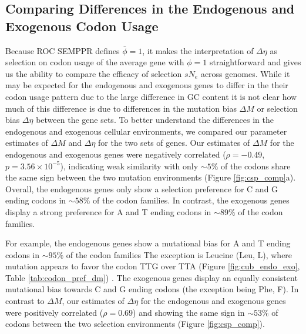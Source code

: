 \documentclass[doublespacing,linenumbers]{bmcart-modified}
\newcommand{\ROC}{ROC SEMPPR\xspace}
\newcommand{\GC}{GC content\xspace}
\newcommand{\DM}{\ensuremath{{\Delta M}}\xspace}
\newcommand{\DE}{\ensuremath{{\Delta \eta}}\xspace}
\newcommand{\Ne}{\ensuremath{N_e}\xspace}
\newcommand{\barphi}{\ensuremath{\bar{\phi}}\xspace}
\begin{document}
\subsection*{Comparing Differences in the Endogenous and Exogenous Codon Usage}
Because \ROC defines $\barphi= 1$,  it makes the interpretation of \DE as selection on codon usage of the average gene with $\phi = 1$ straightforward and gives us the ability to compare the efficacy of selection $s\Ne$  across genomes.
While it may be expected for the endogenous and exogenous genes to differ in the their codon usage pattern due to the large difference in \GC it is not clear how much of this difference is due to differences in the mutation bias \DM or selection bias \DE between the gene sets.
To better understand the differences in the endogenous and exogenous cellular environments, we compared our parameter estimates of  \DM and \DE for the two sets of genes.
Our estimates of \DM for the endogenous and exogenous genes were negatively correlated ($\rho = -0.49$, $p = 3.56\times10^{-5}$),  indicating weak similarity with only $\sim 5\%$ of the codons share the same sign between the two mutation environments (Figure \ref{fig:csp_comp}a).
Overall, the endogenous genes only show a selection preference for C and G ending codons in $\sim58\%$ of the codon families.
In contrast, the exogenous genes display a strong preference for A and T ending codons in $\sim89\%$ of the codon families.

For example, the endogenous genes show a mutational bias for A and T ending codons in $\sim95\%$ of the codon families
The exception is Leucine (Leu, L), where mutation appears to favor the codon TTG over TTA  (Figure \ref{fig:cub_endo_exo}, Table \ref{tab:codon_pref_dm}) .
The exogenous genes display an equally consistent mutational bias towards C and G ending codons (the exception being Phe, F).
In contrast to \DM, our estimates of \DE for the endogenous and exogenous genes were positively correlated ($\rho = 0.69$) and showing the same sign in $\sim53\%$ of codons between the two selection environments (Figure \ref{fig:csp_comp}).
\end{document}
